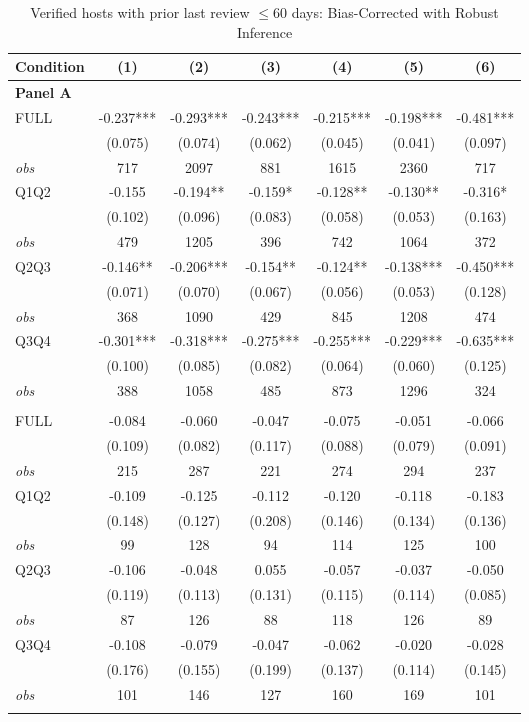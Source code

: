 \begin{table}[!htbp]
\centering
\caption{Verified hosts with prior last review $\leq60$ days: Bias-Corrected with Robust Inference}
\begin{tabular}{lcccccc}
\toprule
Condition & (1) & (2) & (3) & (4) & (5) & (6) \\
\midrule
\multicolumn{7}{l}{\textbf{Panel A}} \\

FULL & -0.237*** & -0.293*** & -0.243*** & -0.215*** & -0.198*** & -0.481*** \\
 & (0.075) & (0.074) & (0.062) & (0.045) & (0.041) & (0.097) \\
\textit{obs} & 717 & 2097 & 881 & 1615 & 2360 & 717 \\
Q1Q2 & -0.155 & -0.194** & -0.159* & -0.128** & -0.130** & -0.316* \\
 & (0.102) & (0.096) & (0.083) & (0.058) & (0.053) & (0.163) \\
\textit{obs} & 479 & 1205 & 396 & 742 & 1064 & 372 \\
Q2Q3 & -0.146** & -0.206*** & -0.154** & -0.124** & -0.138*** & -0.450*** \\
 & (0.071) & (0.070) & (0.067) & (0.056) & (0.053) & (0.128) \\
\textit{obs} & 368 & 1090 & 429 & 845 & 1208 & 474 \\
Q3Q4 & -0.301*** & -0.318*** & -0.275*** & -0.255*** & -0.229*** & -0.635*** \\
 & (0.100) & (0.085) & (0.082) & (0.064) & (0.060) & (0.125) \\
\textit{obs} & 388 & 1058 & 485 & 873 & 1296 & 324 \\
\addlinespace
\multicolumn{7}{l}{\textbf{Panel B}} \\

FULL & -0.084 & -0.060 & -0.047 & -0.075 & -0.051 & -0.066 \\
 & (0.109) & (0.082) & (0.117) & (0.088) & (0.079) & (0.091) \\
\textit{obs} & 215 & 287 & 221 & 274 & 294 & 237 \\
Q1Q2 & -0.109 & -0.125 & -0.112 & -0.120 & -0.118 & -0.183 \\
 & (0.148) & (0.127) & (0.208) & (0.146) & (0.134) & (0.136) \\
\textit{obs} & 99 & 128 & 94 & 114 & 125 & 100 \\
Q2Q3 & -0.106 & -0.048 & 0.055 & -0.057 & -0.037 & -0.050 \\
 & (0.119) & (0.113) & (0.131) & (0.115) & (0.114) & (0.085) \\
\textit{obs} & 87 & 126 & 88 & 118 & 126 & 89 \\
Q3Q4 & -0.108 & -0.079 & -0.047 & -0.062 & -0.020 & -0.028 \\
 & (0.176) & (0.155) & (0.199) & (0.137) & (0.114) & (0.145) \\
\textit{obs} & 101 & 146 & 127 & 160 & 169 & 101 \\
\addlinespace
\multicolumn{7}{l}{\textbf{Panel C}} \\


\end{tabular}
\end{table}
